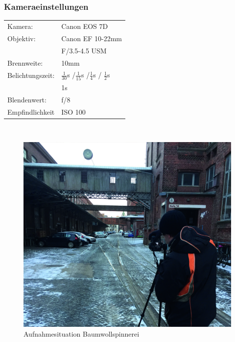\documentclass[liststotoc,bibtotoc,fontsize=14pt,]{scrreprt}
\begin{document}
		\subsubsection{Kameraeinstellungen}
			\begin{minipage}{0.58\textwidth}
				\begin{tabular}{ll}
					Kamera: &Canon EOS 7D \\
					Objektiv: &Canon EF 10-22mm \\
					& F/3.5-4.5 USM\\		
					Brennweite:& 10mm \\
					Belichtungszeit: & $\frac{1}{30}$s /$\frac{1}{15}$s /$\frac{1}{4}$s / $\frac{1}{2}$s \\
					 & 1s\\
					Blendenwert: & f/8\\
					Empfindlichkeit & ISO 100 \\
				\end{tabular}\\
			\end{minipage}%
			\begin{minipage}{0.42\textwidth}
				\begin{figure}[H]
					\includegraphics[width=\linewidth]{img/places/spinnerei.jpg}
					\caption{Aufnahmesituation Baumwollspinnerei}
					\label{img:ak}
				\end{figure}
			\end{minipage}%
\end{document}
